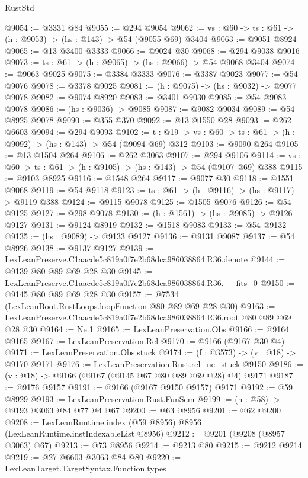 \begin{lexlean}{RustStd}
\begin{coremodule}
@9054 := @3331 @84
@9055 := @294 @9054
@9062 := {vs : @60} -> {ts : @61} -> (h : @9053) -> (hs : @143) -> @54 (@9055 @69) @3404
@9063 := @9051 @8924
@9065 := @13 @3400 @3333
@9066 := @9024 @30
@9068 := @294 @9038 @9016
@9073 := {ts : @61} -> (h : @9065) -> (hs : @9066) -> @54 @9068 @3404
@9074 := @9063 @9025
@9075 := @3384 @3333
@9076 := @3387 @9023
@9077 := @54 @9076
@9078 := @3378 @9025
@9081 := (h : @9075) -> (hs : @9032) -> @9077 @9078
@9082 := @9074 @8920
@9083 := @3401 @9030
@9085 := @54 @9083 @9078
@9086 := (hs : @9036) -> @9085
@9087 := @9082 @9034
@9089 := @54 @8925 @9078
@9090 := @355 @370
@9092 := @13 @1550 @28
@9093 := @262 @6603
@9094 := @294 @9093
@9102 := {t : @19} -> {vs : @60} -> {ts : @61} -> (h : @9092) -> (hs : @143) -> @54 (@9094 @69) @312
@9103 := @9090 @264
@9105 := @13 @1504 @264
@9106 := @262 @3063
@9107 := @294 @9106
@9114 := {vs : @60} -> {ts : @61} -> (h : @9105) -> (hs : @143) -> @54 (@9107 @69) @388
@9115 := @9103 @8925
@9116 := @1548 @264
@9117 := @9077 @30
@9118 := @1551 @9068
@9119 := @54 @9118
@9123 := {ts : @61} -> (h : @9116) -> (hs : @9117) -> @9119 @388
@9124 := @9115 @9078
@9125 := @1505 @9076
@9126 := @54 @9125
@9127 := @298 @9078
@9130 := (h : @1561) -> (hs : @9085) -> @9126 @9127
@9131 := @9124 @8919
@9132 := @1518 @9083
@9133 := @54 @9132
@9135 := (hs : @9089) -> @9133 @9127
@9136 := @9131 @9087
@9137 := @54 @8926
@9138 := @9137 @9127
@9139 := LexLeanPreserve.C1aacde5c819a0f7e2b68dca986038864.R36.denote
@9144 := @9139 @80 @89 @69 @28 @30
@9145 := LexLeanPreserve.C1aacde5c819a0f7e2b68dca986038864.R36.__fits_0
@9150 := @9145 @80 @89 @69 @28 @30
@9157 := @7534 (LexLeanBoot.RustLoops.loopFunction @80 @89 @69 @28 @30)
@9163 := LexLeanPreserve.C1aacde5c819a0f7e2b68dca986038864.R36.root @80 @89 @69 @28 @30
@9164 := Ne.{1}
@9165 := LexLeanPreservation.Obs
@9166 := @9164 @9165
@9167 := LexLeanPreservation.Rel
@9170 := @9166 (@9167 @30 @4)
@9171 := LexLeanPreservation.Obs.stuck
@9174 := (f : @3573) -> (v : @18) -> @9170 @9171
@9176 := LexLeanPreservation.Rust.rel_ne_stuck @9150
@9186 := (v : @18) -> @9166 (@9167 (@9145 @67 @80 @89 @69 @28) @4) @9171
@9187 := @9176 @9157
@9191 := @9166 (@9167 @9150 @9157) @9171
@9192 := @59 @8929
@9193 := LexLeanPreservation.Rust.FunSem
@9199 := (n : @58) -> @9193 @3063 @84 @77 @4 @67
@9200 := @63 @8956
@9201 := @62 @9200
@9208 := LexLeanRuntime.index (@59 @8956) @8956 (LexLeanRuntime.instIndexableList @8956)
@9212 := @9201 (@9208 (@8957 @3063) @67)
@9213 := @73 @8956
@9214 := @9213 @80
@9215 := @9212 @9214
@9219 := @27 @6603 @3063 @84 @80
@9220 := LexLeanTarget.TargetSyntax.Function.types

\end{coremodule}
\end{lexlean}
